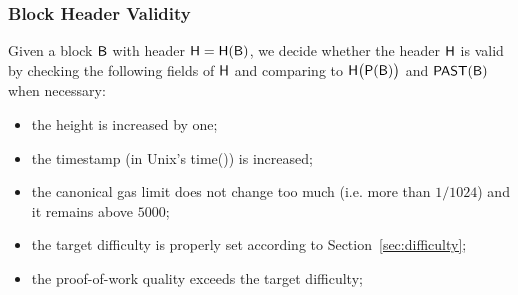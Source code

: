 \subsubsection{Block Header Validity}
\label{sec:valid header}

Given a block $\textsf{B}$ with header $\textsf{H}=\textsf{H}(\textsf{B})$, 
we decide whether the header $\textsf{H}$ is valid by 
checking the following fields of $\textsf{H}$
and comparing to $\textsf{H}\big(\mathsf{P}(\textsf{B})\big)$ and $\mathsf{PAST}(\textsf{B})$ when necessary:

\begin{itemize}[nosep]
	\item the height is increased by one;
	\item the timestamp (in Unix's time()) is increased;

	\item the canonical gas limit does not change too much (i.e. more than $1/1024$) and it remains above $5000$;

	\item the target difficulty is properly set according to Section~\ref{sec:difficulty};

	\item the proof-of-work quality exceeds the target difficulty; 





\end{itemize}

